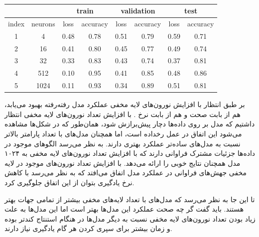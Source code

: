 \documentclass[12pt, a4paper]{article}
\begin{document}
\begin{latin}
\begin{table}[!ht]
    \centering
    \caption{}
    \label{elman_performance_table}
    \begin{tabular}{c|c|c|c|c|c|c|c}
        & & \multicolumn{2}{c|}{\cellcolor{teal!30}train} & \multicolumn{2}{c|}{\cellcolor{teal!30}validation} &  \multicolumn{2}{c}{\cellcolor{teal!30}test} \\ \hline
        index & neurons & loss & accuracy & loss & accuracy & loss & accuracy\\ \hline
        1 & 4 & 0.48 & 0.78 & 0.51 & 0.79 & 0.59 & 0.71 \\
        2 & 16 & 0.41 & 0.80 & 0.45 & 0.77 & 0.49 & 0.74 \\
        3 & 32 & 0.33 & 0.83 & 0.43 & 0.74 & 0.37 & 0.81 \\
        4 & 512 & 0.10 & 0.95 & 0.41 & 0.85 & 0.48 & 0.86 \\
        5 & 1024 & 0.11 & 0.93 & 0.34 & 0.89 & 0.51 & 0.81 \\
    \end{tabular}
\end{table}
\end{latin}

بر طبق انتظار با افزایش نورون‌های لایه مخفی عملکرد مدل رفته‌رفته بهبود می‌یابد، هم از بابت صحت و هم از بابت نرخ .
با افزایش تعداد نورون‌های لایه مخفی انتظار داشتیم که مدل بر روی داده‌ها دچار پیش‌برازش شود، همان‌طور که در شکل‌ها
مشاهده می‌شود این اتفاق در عمل رخداده است، اما همچنان مدل‌های با تعداد پارامتر بالاتر نسبت به مدل‌های ساده‌تر
عملکرد بهتری دارند. به نظر می‌رسد الگوهای موجود در داده‌ها جزئیات مشترک فراوانی دارند که
با افزایش تعداد نورون‌های لایه مخفی به ۱۰۲۴ مدل همچنان نتایج خوبی را ارائه می‌دهد. با
افزایش تعداد نورون‌های موجود در لایه مخفی جهش‌های فراوانی در عملکرد مدل اتفاق می‌افتد که به نظر می‌رسد با کاهش
نرخ یادگیری بتوان از این اتفاق جلوگیری کرد.

تا این جا به نظر می‌رسد که مدل‌های با تعداد لایه‌های مخفی بیشتر از تمامی جهات بهتر هستند.
باید گفت گر چه صحت عملکرد این مدل‌ها بهتر
است اما این مدل‌ها به علت زیاد بودن تعداد نورون‌های لایه مخفی نسبت به دیگر مدل‌ها در هنگام استنتاج کند‌تر بوده
و زمان بیشتر برای سپری کردن هر گام یادگیری نیاز دارند.

\clearpage
\end{document}
